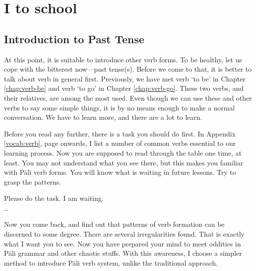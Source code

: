 \chapter{I  to school}\label{chap:past}

{}
\section*{Introduction to Past Tense}

At this point, it is suitable to introduce other verb forms. To be healthy, let us cope with the bitterest now---past tense(s). Before we come to that, it is better to talk about verb in general first. Previously, we have met verb `to be' in Chapter \ref{chap:verb-be} and verb `to go' in Chapter \ref{chap:verb-go}. These two verbs, and their relatives, are among the most used. Even though we can use these and other verbs to say some simple things, it is by no means enough to make a normal conversation. We have to learn more, and there are a lot to learn.

Before you read any further, there is a task you should do first. In Appendix \ref{vocab:verb}, page \pageref{vocab:verb} onwards, I list a number of common verbs essential to our learning process. Now you are supposed to read through the table one time, at least. You may not understand what you see there, but this makes you familiar with P\=ali verb forms. You will know what is waiting in future lessons. Try to grasp the patterns. 

\begin{center}
Please do the task. I am waiting.\\
\ldots
\end{center}

Now you come back, and find out that patterns of verb formation can be discerned to some degree. There are several irregularities found. That is exactly what I want you to see. Now you have prepared your mind to meet oddities in P\=ali grammar and other chaotic stuffs. With this awareness, I choose a simpler method to introduce P\=ali verb system, unlike the traditional approach.

